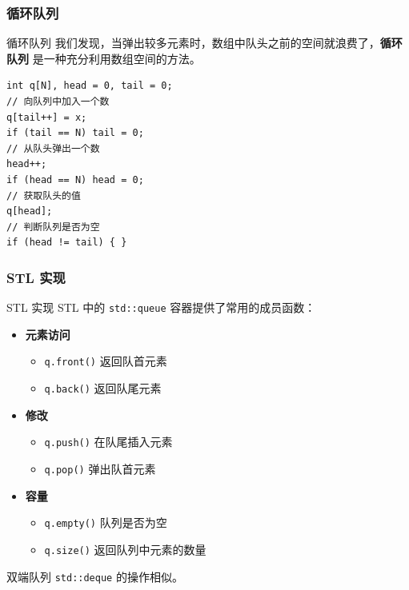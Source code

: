 \documentclass{beamer}
\begin{document}
\subsubsection{循环队列}
\begin{frame}[fragile]{循环队列}
    我们发现，当弹出较多元素时，数组中队头之前的空间就浪费了，\textbf{循环队列} 是一种充分利用数组空间的方法。

    \begin{verbatim}
int q[N], head = 0, tail = 0;
// 向队列中加入一个数
q[tail++] = x;
if (tail == N) tail = 0;
// 从队头弹出一个数
head++;
if (head == N) head = 0;
// 获取队头的值
q[head];
// 判断队列是否为空
if (head != tail) { }
    \end{verbatim}
\end{frame}

\subsubsection{STL 实现}
\begin{frame}[fragile]{STL 实现}
    STL 中的 \texttt{std::queue} 容器提供了常用的成员函数：

    \begin{itemize}
        \item \textbf{元素访问}
        \begin{itemize}
            \item \texttt{q.front()} 返回队首元素
            \item \texttt{q.back()} 返回队尾元素
        \end{itemize}
        \item \textbf{修改}
        \begin{itemize}
            \item \texttt{q.push()} 在队尾插入元素
            \item \texttt{q.pop()} 弹出队首元素
        \end{itemize}
        \item \textbf{容量}
        \begin{itemize}
            \item \texttt{q.empty()} 队列是否为空
            \item \texttt{q.size()} 返回队列中元素的数量
        \end{itemize}
    \end{itemize}

    双端队列 \texttt{std::deque} 的操作相似。
\end{frame}
\end{document}
